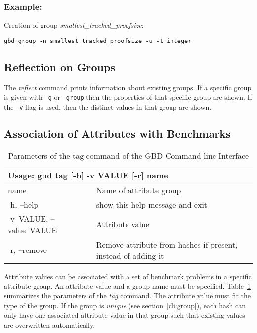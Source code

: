 \documentclass{easychair}
\begin{document}
\subsubsection{Example:}Creation of group \emph{smallest\_tracked\_proofsize}:
\begin{verbatim}
gbd group -n smallest_tracked_proofsize -u -t integer
\end{verbatim}


\subsection{Reflection on Groups}
\label{cli:reflect}

The \emph{reflect} command prints information about existing groups. If a specific group is given with \texttt{-g} or \texttt{\textendash-group} then the properties of that specific group are shown. If the \texttt{-v} flag is used, then the distinct values in that group are shown. 


\subsection{Association of Attributes with Benchmarks}
\label{cli:tag}

\begin{table}[ht]
\begin{tabular}{p{.23\linewidth}|p{.73\linewidth}}
\multicolumn{2}{l}{\bf Usage: \textsf{gbd tag [-h] -v VALUE [-r] name}}\\

\hline
  \sf name                  &Name of attribute group\\

  \sf -h, --help            &show this help message and exit\\
  \sf \mbox{-v VALUE}, \mbox{--value VALUE}
                        &Attribute value\\
  \sf -r, --remove          &Remove attribute from hashes if present, instead of
                        adding it
\end{tabular}
\caption{Parameters of the tag command of the GBD Command-line Interface}
\label{fig:cli:tag}
\end{table}

Attribute values can be associated with a set of benchmark problems in a specific attribute group. 
An attribute value and a group name must be specified. 
Table~\ref{fig:cli:tag} summarizes the parameters of the \emph{tag} command. 
The attribute value must fit the type of the group.
If the group is \emph{unique} (see section~\ref{cli:group}), each hash can only have one associated attribute value in that group such that existing values are overwritten automatically.
\end{document}

